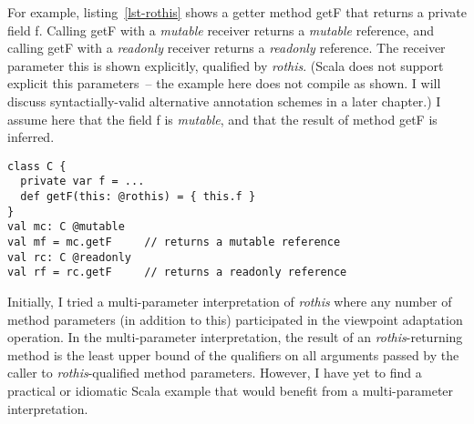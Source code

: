 For example, listing~\ref{lst-rothis} shows a getter method {\cd getF} that
returns a private field {\cd f}. Calling {\cd getF} with a {\em mutable} receiver
returns a {\em mutable} reference, and calling {\cd getF} with a {\em readonly}
receiver returns a {\em readonly} reference.
The receiver parameter {\cd this} is shown
explicitly, qualified by {\em rothis}. (Scala does not support explicit {\cd this} parameters~--
the example here does not compile as shown. I will discuss syntactially-valid
alternative annotation schemes in a later chapter.)
I assume here that the field {\cd f} is {\em mutable}, and that the result of
method {\cd getF} is inferred.

\begin{lstlisting}[caption={Polymorphism with {\em rothis}},label={lst-rothis},float=htp]
class C {
  private var f = ...
  def getF(this: @rothis) = { this.f }
}
val mc: C @mutable
val mf = mc.getF     // returns a mutable reference
val rc: C @readonly
val rf = rc.getF     // returns a readonly reference
\end{lstlisting}



Initially, I tried a multi-parameter interpretation of {\em rothis}
where any number of method parameters (in addition to {\cd this}) participated
in the viewpoint adaptation operation.
In the multi-parameter interpretation, the result of an {\em rothis}-returning
method is the least upper bound of the qualifiers on all arguments passed by the caller
to {\em rothis}-qualified method parameters.
However, I have yet to find a practical or idiomatic Scala example that
would benefit from a multi-parameter interpretation.

\begin{comment}
Scala has built-in support for type polymorphism.
Listing~\ref{lst-polymorph-via-types} shows 
I conjecture that, for any practical cases where qualifier polymorphism beyond {\em rothis}
is required, Scala's standard facilities for type polymorphism will be adequate.
\begin{lstlisting}[caption={Qualifier Polymorphism Via Type Polymorphism},label={lst-polymorph-via-types},float=htp]
def m(t: T): R = ...                                      // monomorphic
def m[U <: T @readonly, V <: R @readonly](t: U): V = ...  // polymorphic 
\end{lstlisting}
\end{comment}

